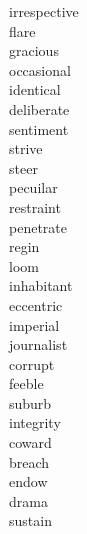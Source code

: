 \documentclass[a4paper, 10pt]{ctexart}
\begin{document}
\begin{multicols*}{2}
\begin{description}
\item[irrespective]

\item[flare]

\item[gracious]

\item[occasional]

\item[identical]

\item[deliberate]

\item[sentiment]

\item[strive]

\item[steer]

\item[pecuilar]

\item[restraint]

\item[penetrate]

\item[regin]

\item[loom]

\item[inhabitant]

\item[eccentric]

\item[imperial]

\item[journalist]

\item[corrupt]

\item[feeble]

\item[suburb]

\item[integrity]

\item[coward]

\item[breach]

\item[endow]

\item[drama]

\item[sustain]


\end{description}
\end{multicols*}
\end{document}

